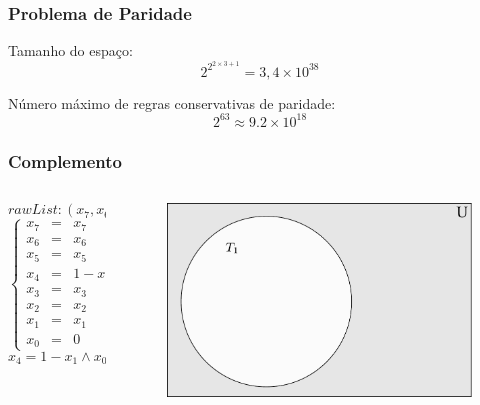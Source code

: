 \documentclass[aspectratio=43,hyperref={pdfpagelabels=false}]{beamer}
\begin{document}
\begin{frame}
    \frametitle{Problema de Paridade}

    Tamanho do espaço:
    \begin{equation}
    2^{2^{2\times3+1}}=3,4 \times 10^{38}
    \end{equation}

    Número máximo de regras conservativas de paridade:
    \begin{equation}
    2^{63} \approx  9.2\times 10^{18}
    \end{equation}

    


\end{frame}

\begin{frame}
    \frametitle{Complemento}
    \begin{columns}
        \begin{column}{5cm}
    \begin{equation}
    rawList:(x_7, x_6, x_5, 1 - x_1, x_3, x_2, x_1, 0)
    \end{equation}
    \begin{equation}
    \left\{\begin{matrix}
    x_7 & = & x_7   \\ 
    x_6 & = & x_6   \\ 
    x_5 & = & x_5   \\ 
    x_4 & = & 1 - x_1 \\ 
    x_3 & = & x_3   \\ 
    x_2 & = & x_2   \\ 
    x_1 & = & x_1   \\ 
    x_0 & = & 0
    \end{matrix}\right.
    \end{equation}
    \begin{equation}
    x_4 = 1 - x_1 \wedge x_0 = 0
    \end{equation}
    \end{column}

    \begin{column}{5cm}
        \begin{figure}[h!]
          \centering
          \includegraphics[width=.8\textwidth]{fig_complement3.pdf}
        \end{figure}
    \end{column}
\end{columns}
\end{frame}
\end{document}
